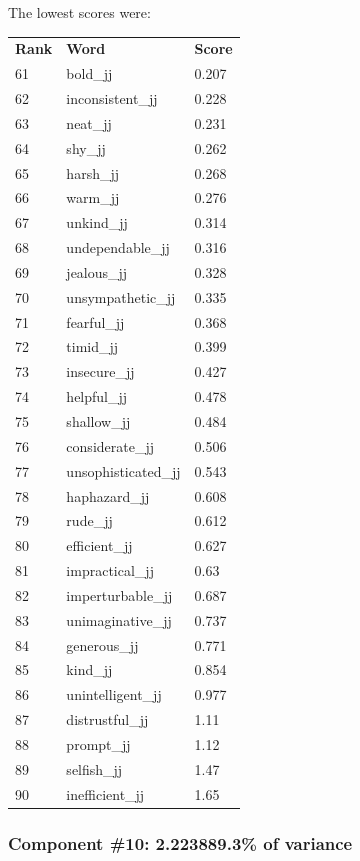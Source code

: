 \documentclass[10pt,letterpaper]{book}
\begin{document}
The lowest scores were:
\begin{tabular}{ l l l }
        \textbf{Rank} & \textbf{Word} & \textbf{Score} \\
        61 & bold\_jj & 0.207 \\
        62 & inconsistent\_jj & 0.228 \\
        63 & neat\_jj & 0.231 \\
        64 & shy\_jj & 0.262 \\
        65 & harsh\_jj & 0.268 \\
        66 & warm\_jj & 0.276 \\
        67 & unkind\_jj & 0.314 \\
        68 & undependable\_jj & 0.316 \\
        69 & jealous\_jj & 0.328 \\
        70 & unsympathetic\_jj & 0.335 \\
        71 & fearful\_jj & 0.368 \\
        72 & timid\_jj & 0.399 \\
        73 & insecure\_jj & 0.427 \\
        74 & helpful\_jj & 0.478 \\
        75 & shallow\_jj & 0.484 \\
        76 & considerate\_jj & 0.506 \\
        77 & unsophisticated\_jj & 0.543 \\
        78 & haphazard\_jj & 0.608 \\
        79 & rude\_jj & 0.612 \\
        80 & efficient\_jj & 0.627 \\
        81 & impractical\_jj & 0.63 \\
        82 & imperturbable\_jj & 0.687 \\
        83 & unimaginative\_jj & 0.737 \\
        84 & generous\_jj & 0.771 \\
        85 & kind\_jj & 0.854 \\
        86 & unintelligent\_jj & 0.977 \\
        87 & distrustful\_jj & 1.11 \\
        88 & prompt\_jj & 1.12 \\
        89 & selfish\_jj & 1.47 \\
        90 & inefficient\_jj & 1.65 \\
\end{tabular}
\subsubsection{Component \#10: 2.223889.3\% of variance}
\end{document}
